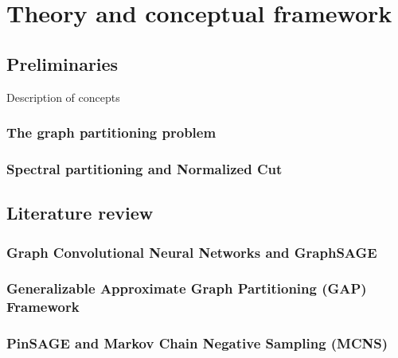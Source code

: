 %
%
\let\textcircled=\pgftextcircled
\chapter{Theory and conceptual framework}
\label{Chapter2}

\section{Preliminaries}
Description of concepts
\subsection{The graph partitioning problem}

\subsection{Spectral partitioning and Normalized Cut}

\section{Literature review}

\subsection{Graph Convolutional Neural Networks and GraphSAGE}

\subsection{Generalizable Approximate Graph Partitioning (GAP) Framework}

\subsection{PinSAGE and Markov Chain Negative Sampling (MCNS)}

	


